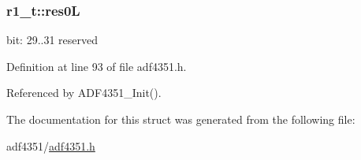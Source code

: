 \subsubsection[{\texorpdfstring{res0L}{res0L}}]{ r1\+\_\+t\+::res0L}\hypertarget{structr1__t_a0ce8c11e3227892e5d9afcde148d9300}{}\label{structr1__t_a0ce8c11e3227892e5d9afcde148d9300}
bit\+: 29..31 reserved 

Definition at line 93 of file adf4351.\+h.



Referenced by A\+D\+F4351\+\_\+\+Init().



The documentation for this struct was generated from the following file\+:\begin{DoxyCompactItemize}
\item 
adf4351/\hyperlink{adf4351_8h}{adf4351.\+h}\end{DoxyCompactItemize}
